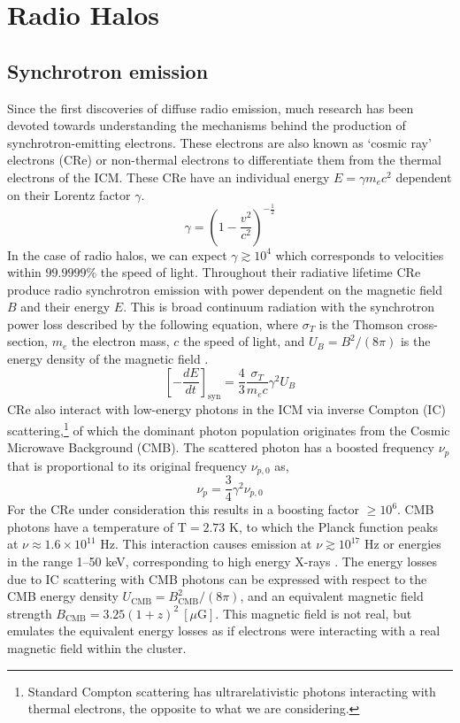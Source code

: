 \chapter[Radio Halos]{Radio Halos}
\label{Chap:Background}
\section{Synchrotron emission}
Since the first discoveries of diffuse radio emission, much research has been devoted towards understanding the mechanisms behind the production of synchrotron-emitting electrons. These electrons are also known as `cosmic ray' electrons (CRe) or non-thermal electrons to differentiate them from the thermal electrons of the ICM. These CRe have an individual energy $E=\gamma m_e c^2$ dependent on their Lorentz factor $\gamma$. 
\begin{equation}
    \gamma = \left(1-\frac{v^2}{c^2}\right)^{-\frac12}
\end{equation}
In the case of radio halos, we can expect $\gamma\gtrsim10^4$ which corresponds to velocities within $99.9999\%$ the speed of light. Throughout their radiative lifetime CRe produce radio synchrotron emission with power dependent on the magnetic field $B$ and their energy $E$. This is broad continuum radiation with the synchrotron power loss described by the following equation, where $\sigma_T$ is the Thomson cross-section, $m_e$ the electron mass, $c$ the speed of light, and $U_B = B^2/(8\pi)$ is the energy density of the magnetic field \citep{Sarazin1999}. 
\begin{equation}
    \left[-\frac{dE}{dt}\right]_{\mathrm{syn}} = \frac43\frac{\sigma_T}{m_e c} \gamma^2 U_{B}
\end{equation}
CRe also interact with low-energy photons in the ICM via inverse Compton (IC) scattering,\footnote{Standard Compton scattering has ultrarelativistic photons interacting with thermal electrons, the opposite to what we are considering.} of which the dominant photon population originates from the Cosmic Microwave Background (CMB). The scattered photon has a boosted frequency $\nu_p$ that is proportional to its original frequency $\nu_{p,0}$ as,
\begin{equation}
    \nu_p = \frac34\gamma^2 \nu_{p,0}
\end{equation}
For the CRe under consideration this results in a boosting factor $\geq10^6$. CMB photons have a temperature of $\text{T} = 2.73$ K, to which the Planck function peaks at $\nu \approx 1.6\times10^{11}$ Hz. This interaction causes emission at $\nu\gtrsim10^{17}$ Hz or energies in the range 1--50 keV, corresponding to high energy X-rays \citep{Sarazin1999, Govoni2004}. The energy losses due to IC scattering with CMB photons can be expressed with respect to the CMB energy density $U_{\mathrm{CMB}} = B^2_{\mathrm{CMB}}/(8\pi)$, and an equivalent magnetic field strength $B_{\mathrm{CMB}} = 3.25(1+z)^2\> [\mu\text{G}]$. This magnetic field is not real, but emulates the equivalent energy losses as if electrons were interacting with a real magnetic field within the cluster. 
